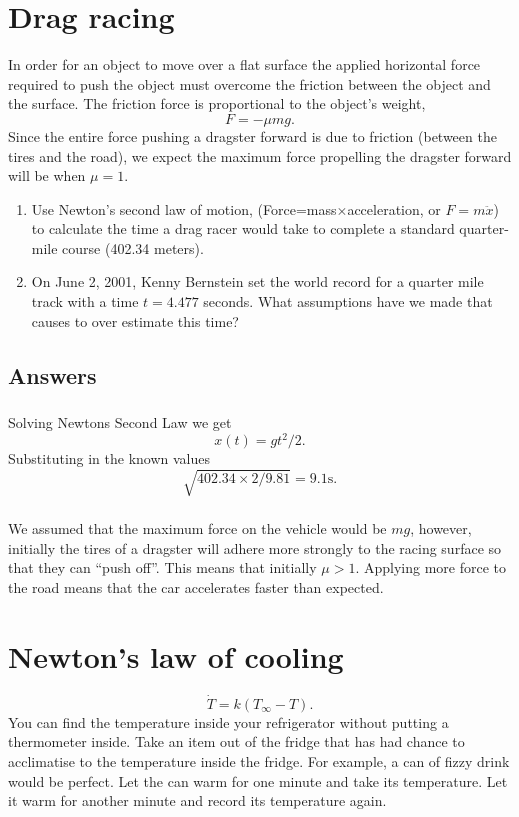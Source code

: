 \documentclass[10pt]{article}
\newcommand{\bb}{\begin{equation}}
\newcommand{\ee}{\end{equation}}
\begin{document}
\section{Drag racing}
In order for an object to move over a flat surface the applied horizontal force required to push the object must overcome the friction between the object and the surface. The friction force is proportional to the object's weight,
\bb
F=-\mu mg.
\ee
Since the entire force pushing a dragster forward is due to friction (between the tires and the road), we expect the maximum force propelling the dragster forward will be when $\mu=1$.
\begin{enumerate}
\item Use Newton's second law of motion, (Force=mass$\times$acceleration, or $F=m\ddot{x}$) to calculate the time a drag racer would take to complete a standard quarter-mile
course (402.34 meters).
\item On June 2, 2001, Kenny Bernstein set the world record for a
quarter mile track with a time $t = 4.477$ seconds. What assumptions have we made that causes to over estimate this time?
\end{enumerate}
\begin{Answ}
\subsection{Answers}
\subsubsection{}
Solving Newtons Second Law we get
\bb
x(t)=gt^2/2.
\ee
Substituting in the known values
\bb
\sqrt{402.34\times 2/9.81}= 9.1 \textrm{s}.
\ee
\subsubsection{}
We assumed that the maximum force on the vehicle would be $mg$, however, initially the tires of a dragster will adhere more strongly to the racing surface so that they can ``push off''. This means that initially $\mu>1$. Applying more force to the road means that the car accelerates faster than expected.
\end{Answ}


\section{Newton's law of cooling}
\bb
\dot{T}=k(T_\infty-T)\label{Newtons_law_cooling}.
\ee
You can find the temperature inside your refrigerator without putting a thermometer inside. Take an item out of the fridge that has had chance to acclimatise to the temperature inside the fridge. For example, a can of fizzy drink would be perfect. Let the can warm for one minute and take its temperature. Let it warm for another minute and record its temperature again.
\end{document}
